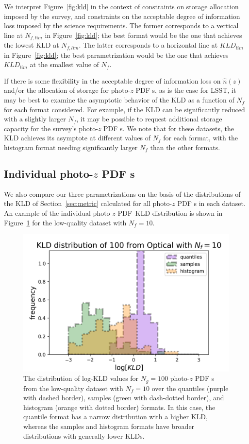 \documentclass[\docopts]{\docclass}
\newcommand{\pz}{photo-$z$ PDF\xspace}
\begin{document}
We interpret Figure~\ref{fig:kld} in the context of constraints on storage
allocation imposed by the survey, and constraints on the acceptable degree of
information loss imposed by the science requirements.  The former corresponds
to a vertical line at $N_{f, lim}$ in Figure~\ref{fig:kld}; the best format would
be the one that achieves the lowest KLD at $N_{f, lim}$.  The latter
corresponds to a horizontal line at $KLD_{lim}$ in Figure~\ref{fig:kld}; the best
parametrization would be the one that achieves $KLD_{lim}$ at the smallest
value of $N_{f}$.

If there is some flexibility in the acceptable degree of information loss on
$\hat{n}(z)$ and/or the allocation of storage for \pz s, as is the case for
LSST, it may be best to examine the asymptotic behavior of the KLD as a
function of $N_{f}$ for each format considered.
For example, if the KLD can be significantly reduced with
a slightly larger $N_{f}$, it may be possible to request additional storage
capacity for the survey's \pz s.  We note that for these datasets, the KLD
achieves its asymptote at different values of $N_{f}$ for each format, with the
histogram format needing significantly larger $N_{f}$ than the other formats.

\subsection{Individual \pz s}
\label{sec:individual_results}

We also compare our three parametrizations on the basis of the distributions of the KLD
of Section~\ref{sec:metric} calculated for all \pz s in each
dataset.  An example of the individual \pz\ KLD distribution is shown in Figure~\ref{fig:individual} for the low-quality dataset with $N_{f}=10$.

\begin{figure}
  \includegraphics[width=0.9\columnwidth]{figures/lsst_individual.png}
  \caption{The distribution of log-KLD
values for $N_{g}=100$ \pz s from the low-quality dataset with $N_{f}=10$ over
the quantiles (purple with dashed border), samples (green with dash-dotted
border), and histogram (orange with dotted border) formats.  In this case, the
quantile format has a narrow distribution with a higher KLD, whereas the
samples and histogram formats have broader distributions with generally lower
KLDs.
  \label{fig:individual}}
\end{figure}
\end{document}
